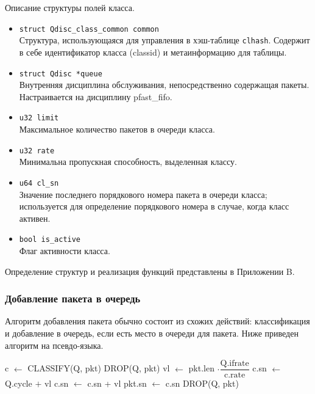 			Описание структуры полей класса.
			\begin{itemize}
				\item \lstinline{struct Qdisc_class_common common} \\
					Структура, использующаяся для управления в хэш-таблице \lstinline{clhash}.
					Содержит в себе идентификатор класса (classid) и метаинформацию для таблицы.
				\item \lstinline{struct Qdisc *queue} \\
					Внутренняя дисциплина обслуживания, непосредственно содержащая пакеты.
					Настраивается на дисциплину {pfast\_fifo}.
				\item \lstinline{u32 limit}\\
					Максимальное количество пакетов в очереди класса.
				\item \lstinline{u32 rate}\\
					Минимальна пропускная способность, выделенная классу.
				\item \lstinline{u64 cl_sn} \\
					Значение последнего порядкового номера пакета в очереди класса;
					используется для определение порядкового номера в случае, когда
					класс активен.
				\item \lstinline{bool is_active} \\
					Флаг активности класса.
			\end{itemize}

			Определение структур и реализация функций представлены в Приложении B. 

		\subsubsection{Добавление пакета в очередь}

			Алгоритм добавления пакета обычно состоит из схожих действий:
			классификация и добавление в очередь, если есть место в очереди
			для пакета. Ниже приведен алгоритм на псевдо-языка.

			\begin{algorithmic}[1]
					\State c $\gets $ CLASSIFY(Q, pkt)
						\State DROP(Q, pkt)
						\State vl $\gets$ pkt.len $\cdot \dfrac {\text{Q.ifrate}} {\text{c.rate}} $
							\State c.sn $\gets$ Q.cycle $+$ vl
						\Else
							\State c.sn $\gets$ c.sn + vl
						\EndIf
						\State pkt.sn $\gets$ c.sn
					\Else
						\State DROP(Q, pkt)
					\EndIf
				\EndFunction
			\end{algorithmic}

